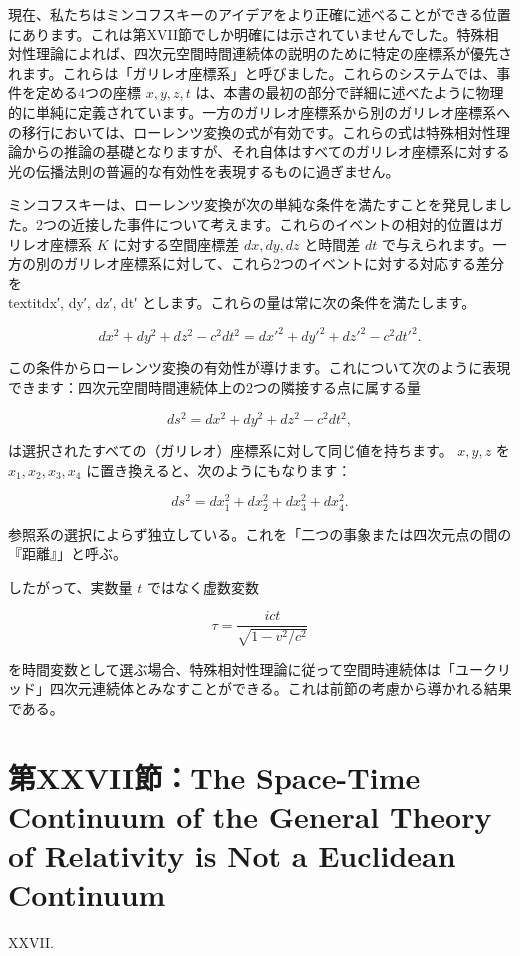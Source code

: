 \documentclass[a4paper,11pt,openany]{ltjsbook}
\begin{document}
現在、私たちはミンコフスキーのアイデアをより正確に述べることができる位置にあります。これは第XVII節でしか明確には示されていませんでした。特殊相対性理論によれば、四次元空間時間連続体の説明のために特定の座標系が優先されます。これらは「ガリレオ座標系」と呼びました。これらのシステムでは、事件を定める4つの座標 $x, y, z, t$ は、本書の最初の部分で詳細に述べたように物理的に単純に定義されています。一方のガリレオ座標系から別のガリレオ座標系への移行においては、ローレンツ変換の式が有効です。これらの式は特殊相対性理論からの推論の基礎となりますが、それ自体はすべてのガリレオ座標系に対する光の伝播法則の普遍的な有効性を表現するものに過ぎません。

ミンコフスキーは、ローレンツ変換が次の単純な条件を満たすことを発見しました。2つの近接した事件について考えます。これらのイベントの相対的位置はガリレオ座標系 $K$ に対する空間座標差 $dx, dy, dz$ と時間差 $dt$ で与えられます。一方の別のガリレオ座標系に対して、これら2つのイベントに対する対応する差分を \\textit{dx′, dy′, dz′, dt′} とします。これらの量は常に次の条件を満たします。

\[
dx^2 + dy^2 + dz^2 - c^2 dt^2 = dx'^2 + dy'^2 + dz'^2 - c^2 dt'^2.
\]

この条件からローレンツ変換の有効性が導けます。これについて次のように表現できます：四次元空間時間連続体上の2つの隣接する点に属する量

\[
ds^2 = dx^2 + dy^2 + dz^2 - c^2 dt^2,
\]

は選択されたすべての（ガリレオ）座標系に対して同じ値を持ちます。 $x, y, z$ を $x_1, x_2, x_3, x_4$ に置き換えると、次のようにもなります：

\[
ds^2 = dx_1^2 + dx_2^2 + dx_3^2 + dx_4^2.
\]

参照系の選択によらず独立している。これを「二つの事象または四次元点の間の『距離』」と呼ぶ。

したがって、実数量 $t$ ではなく虚数変数

\[
\tau = \frac{ict}{\sqrt{1 - v^2/c^2}}
\]

を時間変数として選ぶ場合、特殊相対性理論に従って空間時連続体は「ユークリッド」四次元連続体とみなすことができる。これは前節の考慮から導かれる結果である。


\clearpage
\chapter{第XXVII節：The Space-Time Continuum of the General Theory of Relativity is Not a Euclidean Continuum}

XXVII.
\end{document}

